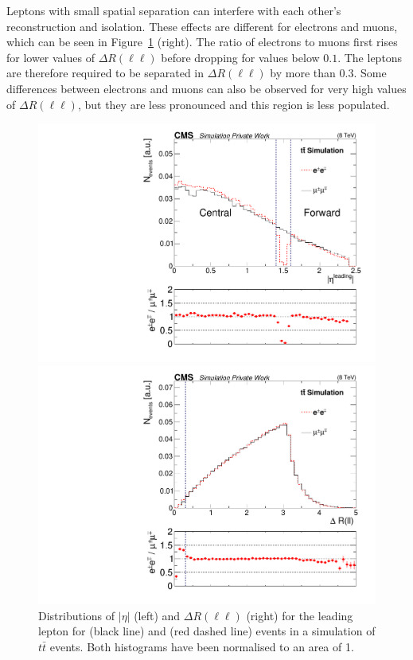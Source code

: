 Leptons with small spatial separation can interfere with each other's reconstruction and isolation. These effects are different for electrons and muons, which can be seen in Figure~\ref{fig:cutJustification} (right). The ratio of electrons to muons first rises for lower values of $\Delta R(\ell\ell)$ before dropping for values below $0.1$. The leptons are therefore required to be separated in $\Delta R(\ell\ell)$ by more than 0.3. Some differences between electrons and muons can also be observed for very high values of $\Delta R(\ell\ell)$, but they are less pronounced and this region is less populated.  

\begin{figure}[htbp]
\centering
\begin{minipage}[t]{0.49\textwidth}
  \includegraphics[width=\textwidth]{plots/SELECTION/gapJustification.pdf}
\end{minipage}
\begin{minipage}[t]{0.49\textwidth}
\includegraphics[width=\textwidth]{plots/SELECTION/dRJustification_eeVSmm.pdf}
\end{minipage}
\caption{Distributions of $|\eta|$ (left) and $\Delta R(\ell\ell)$ (right) for the leading lepton for \MM (black line) and \EE (red dashed line) events in a simulation of $t\bar{t}$ events. Both histograms have been normalised to an area of 1.}
\label{fig:cutJustification}
\end{figure}    

